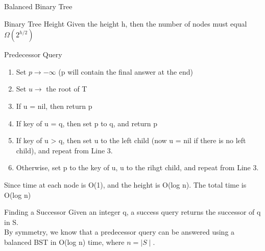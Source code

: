 \documentclass{lecture}
\begin{document}
\begin{landscape}
\begin{multicols}{2}
\begin{note}{Balanced Binary Tree}
    \end{note}
    \vfill
    \begin{note}{Binary Tree Height}
        Given the height h, then the number of nodes must equal $\Omega(2^{h/2})$
    \end{note}
    \vfill
    \begin{note}{Predecessor Query}
        \begin{enumerate}[nolistsep]
            \item Set $p\rightarrow -\infty$ (p will contain the final answer at the end)
            \item Set $u\rightarrow$ the root of T
            \item If u = nil, then return p
            \item If key of u = q, then set p to q, and return p
            \item If key of u > q, then set u to the left child (now u = nil if there is no left child), and repeat from Line 3.
            \item Otherwise, set p to the key of u, u to the rihgt child, and repeat from Line 3.
        \end{enumerate}
        Since time at each node is O(1), and the height is O(log n). The total time is O(log n)
    \end{note}
    \vfill
    \begin{note}{Finding a Successor}
        Given an integer q, a success query returns the successor of q in S.\\
        By symmetry, we know that a predecessor query can be answered using a balanced BST in O(log n) time, where $n=\mid S\mid$.
    \end{note}
    \vfill


\end{multicols}
\end{landscape}
\end{document}
